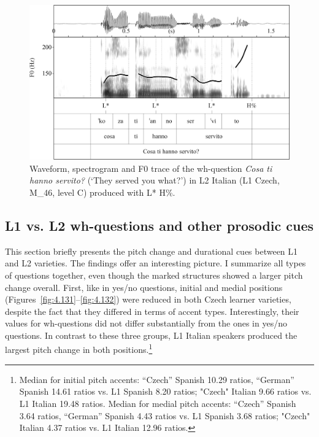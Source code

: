 \begin{figure}


\includegraphics[width=\textwidth]{figures/Figure_4.130.png}



\caption{Waveform, spectrogram and F0 trace of the wh-question \textit{Cosa ti hanno servito?} (‘They served you what?’) in L2 Italian (L1 Czech, M\_46, level C) produced with L* H\%.}
\label{fig:4.130}
\end{figure}

\subsection{L1 vs. L2 wh-questions and other prosodic cues}\label{sec:4.4.4}

This section briefly presents the pitch change and durational cues between L1 and L2 varieties. The findings offer an interesting picture. I summarize all types of questions together, even though the marked structures showed a larger pitch change overall. First, like in yes/no questions, initial and medial positions (Figures~\ref{fig:4.131}--\ref{fig:4.132}) were reduced in both Czech learner varieties, despite the fact that they differed in terms of accent types. Interestingly, their values for wh-questions did not differ substantially from the ones in yes/no questions. In contrast to these three groups, L1 Italian speakers produced the largest pitch change in both positions.\footnote{Median for initial pitch accents: “Czech” Spanish 10.29 ratios, “German” Spanish 14.61 ratios vs. L1 Spanish 8.20 ratios; "Czech" Italian 9.66 ratios vs. L1 Italian 19.48 ratios. Median for medial pitch accents: “Czech” Spanish 3.64 ratios, “German” Spanish 4.43 ratios vs. L1 Spanish 3.68 ratios; "Czech" Italian 4.37 ratios vs. L1 Italian 12.96 ratios.}

